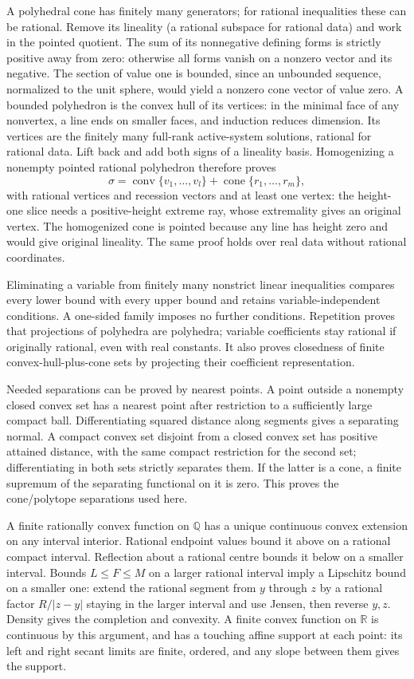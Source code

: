 \documentclass[
  11pt,
]{article}
\begin{document}
A polyhedral cone has finitely many generators; for rational
inequalities these can be rational. Remove its lineality (a rational
subspace for rational data) and work in the pointed quotient. The sum of
its nonnegative defining forms is strictly positive away from zero:
otherwise all forms vanish on a nonzero vector and its negative. The
section of value one is bounded, since an unbounded sequence, normalized
to the unit sphere, would yield a nonzero cone vector of value zero. A
bounded polyhedron is the convex hull of its vertices: in the minimal
face of any nonvertex, a line ends on smaller faces, and induction
reduces dimension. Its vertices are the finitely many full-rank
active-system solutions, rational for rational data. Lift back and add
both signs of a lineality basis. Homogenizing a nonempty pointed
rational polyhedron therefore proves \[
 \sigma=\operatorname{conv}\{v_1,\ldots,v_l\}
                    +\operatorname{cone}\{r_1,\ldots,r_m\},     \tag{8}
\] with rational vertices and recession vectors and at least one vertex:
the height-one slice needs a positive-height extreme ray, whose
extremality gives an original vertex. The homogenized cone is pointed
because any line has height zero and would give original lineality. The
same proof holds over real data without rational coordinates.

Eliminating a variable from finitely many nonstrict linear inequalities
compares every lower bound with every upper bound and retains
variable-independent conditions. A one-sided family imposes no further
conditions. Repetition proves that projections of polyhedra are
polyhedra; variable coefficients stay rational if originally rational,
even with real constants. It also proves closedness of finite
convex-hull-plus-cone sets by projecting their coefficient
representation.

Needed separations can be proved by nearest points. A point outside a
nonempty closed convex set has a nearest point after restriction to a
sufficiently large compact ball. Differentiating squared distance along
segments gives a separating normal. A compact convex set disjoint from a
closed convex set has positive attained distance, with the same compact
restriction for the second set; differentiating in both sets strictly
separates them. If the latter is a cone, a finite supremum of the
separating functional on it is zero. This proves the cone/polytope
separations used here.

A finite rationally convex function on \(\mathbb Q\) has a unique
continuous convex extension on any interval interior. Rational endpoint
values bound it above on a rational compact interval. Reflection about a
rational centre bounds it below on a smaller interval. Bounds
\(L\leq F\leq M\) on a larger rational interval imply a Lipschitz bound
on a smaller one: extend the rational segment from \(y\) through \(z\)
by a rational factor \(R/|z-y|\) staying in the larger interval and use
Jensen, then reverse \(y,z\). Density gives the completion and
convexity. A finite convex function on \(\mathbb R\) is continuous by
this argument, and has a touching affine support at each point: its left
and right secant limits are finite, ordered, and any slope between them
gives the support.
\end{document}
